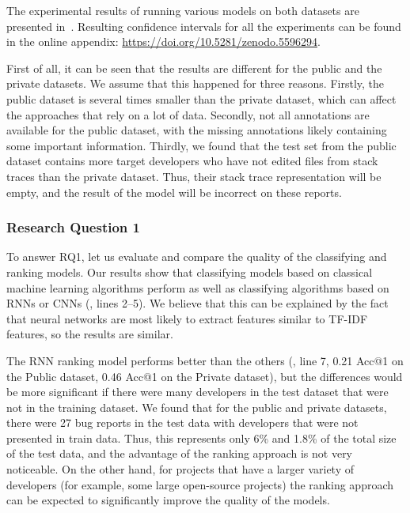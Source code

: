 

The experimental results of running various models on both datasets are presented in~. Resulting confidence intervals for all the experiments can be found in the online appendix: \url{https://doi.org/10.5281/zenodo.5596294}.

First of all, it can be seen that the results are different for the public and the private datasets. We assume that this happened for three reasons. Firstly, the public dataset is several times smaller than the private dataset, which can affect the approaches that rely on a lot of data. Secondly, not all annotations are available for the public dataset, with the missing annotations likely containing some important information. Thirdly, we found that the test set from the public dataset contains more target developers who have not edited files from stack traces than the private dataset. Thus, their stack trace representation will be empty, and the result of the model will be incorrect on these reports.

\subsubsection{Research Question 1} 
To answer RQ1, let us evaluate and compare the quality of the classifying and ranking models. Our results show that classifying models based on classical machine learning algorithms perform as well as classifying algorithms based on RNNs or CNNs (, lines 2--5). We believe that this can be explained by the fact that neural networks are most likely to extract features similar to TF-IDF features, so the results are similar. 

The RNN ranking model performs better than the others (, line 7, 0.21 Acc@1 on the Public dataset, 0.46 Acc@1 on the Private dataset), but the differences would be more significant if there were many developers in the test dataset that were not in the training dataset. We found that for the public and private datasets, there were 27 bug reports in the test data with developers that were not presented in train data. Thus, this represents only 6\% and 1.8\% of the total size of the test data, and the advantage of the ranking approach is not very noticeable. On the other hand, for projects that have a larger variety of developers (for example, some large open-source projects) the ranking approach can be expected to significantly improve the quality of the models.

